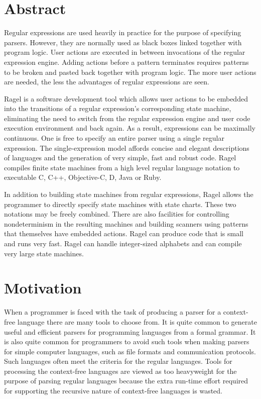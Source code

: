 \documentclass[letterpaper,11pt,oneside]{book}
\begin{document}
\section{Abstract}

Regular expressions are used heavily in practice for the purpose of specifying
parsers. However, they are normally used as black boxes linked together with
program logic.  User actions are executed in between invocations of the regular
expression engine. Adding actions before a pattern terminates requires patterns
to be broken and pasted back together with program logic. The more user actions
are needed, the less the advantages of regular expressions are seen. 

Ragel is a software development tool which allows user actions to be 
embedded into the transitions of a regular expression's corresponding state
machine, eliminating the need to switch from the regular expression engine and
user code execution environment and back again. As a result, expressions can be
maximally continuous.  One is free to specify an entire parser using a single
regular expression.  The single-expression model affords concise and elegant
descriptions of languages and the generation of very simple, fast and robust
code.  Ragel compiles finite state machines from a high level regular language
notation to executable C, C++, Objective-C, D, Java or Ruby.

In addition to building state machines from regular expressions, Ragel allows
the programmer to directly specify state machines with state charts. These two
notations may be freely combined. There are also facilities for controlling
nondeterminism in the resulting machines and building scanners using patterns
that themselves have embedded actions. Ragel can produce code that is small and
runs very fast. Ragel can handle integer-sized alphabets and can compile very
large state machines.

\section{Motivation}

When a programmer is faced with the task of producing a parser for a
context-free language there are many tools to choose from. It is quite common
to generate useful and efficient parsers for programming languages from a
formal grammar. It is also quite common for programmers to avoid such tools
when making parsers for simple computer languages, such as file formats and
communication protocols.  Such languages often meet the criteria for the
regular languages.  Tools for processing the context-free languages are viewed
as too heavyweight for the purpose of parsing regular languages because the extra
run-time effort required for supporting the recursive nature of context-free
languages is wasted.
\end{document}
